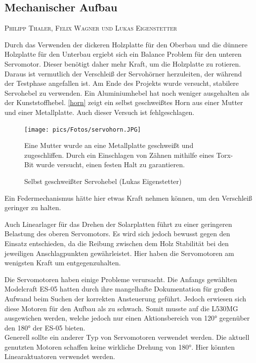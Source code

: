 \documentclass[12pt,a4paper,bibliography=totocnumbered,listof=totocnumbered]{article}
\makeatletter
\newcommand{\chapterauthor}[1]{%
  {\parindent0pt\vspace*{-5pt}%
  \linespread{1.1}\small\scshape#1%
  \par\nobreak\vspace*{3pt}}
  \@afterheading%
}
\makeatother
\begin{document}

\subsection{Mechanischer Aufbau}
\chapterauthor{Philipp Thaler, Felix Wagner und Lukas Eigenstetter}
Durch das Verwenden der dickeren Holzplatte für den Oberbau und die dünnere Holzplatte für den Unterbau ergiebt sich ein Balance Problem für den unteren Servomotor.
Dieser benötigt daher mehr Kraft, um die Holzplatte zu rotieren. Daraus ist vermutlich der Verschleiß der Servohörner herzuleiten, der während der Testphase angefallen ist.
Am Ende des Projekts wurde versucht, stabilere Servohebel zu verwenden.
Ein Aluminiumhebel hat noch weniger ausgehalten als der Kunststoffhebel.
\autoref{horn} zeigt ein selbst geschweißtes Horn aus einer Mutter und einer Metallplatte.
Auch dieser Versuch ist fehlgeschlagen.

\begin{figure}[htpb] %
	\begin{center}
	\texttt{[image: pics/Fotos/servohorn.JPG]}
	\caption{Selbst geschweißter Servohebel (Lukas Eigenstetter)}
	\label{horn}
	\end{center}
	Eine Mutter wurde an eine Metallplatte geschweißt und zugeschliffen.
	Durch ein Einschlagen von Zähnen mithilfe eines Torx-Bit wurde versucht, einen festen Halt zu garantieren.
\end{figure}

Ein Federmechanismus hätte hier etwas Kraft nehmen können, um den Verschleiß geringer zu halten.

Auch Linearlager für das Drehen der Solarplatten führt zu einer geringeren Belastung des oberen Servomotors.
Es wird sich jedoch bewusst gegen den Einsatz entschieden, da die Reibung zwischen dem Holz Stabilität bei den jeweiligen Anschlagpunkten gewährleistet.
Hier haben die Servomotoren am wenigsten Kraft um entgegenzuhalten.


Die Servomotoren haben einige Probleme verursacht. 
Die Anfangs gewählten Modelcraft ES-05 hatten durch ihre mangelhafte Dokumentation für großen Aufwand beim Suchen der korrekten Ansteuerung geführt.
Jedoch erwiesen sich diese Motoren für den Aufbau als zu schwach. 
Somit musste auf die L530MG ausgewichen werden, welche jedoch nur einen Aktionsbereich von 120° gegenüber den 180° der ES-05 bieten. \\
Generell sollte ein anderer Typ von Servomotoren verwendet werden. Die aktuell genutzten Motoren schaffen keine wirkliche Drehung von 180°. Hier könnten Linearaktuatoren verwendet werden.
\end{document}

